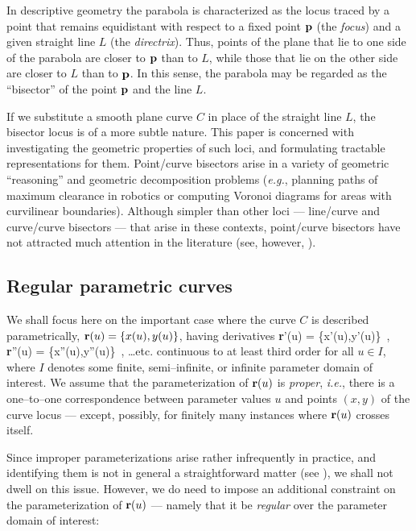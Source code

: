 In descriptive geometry \cite{coxeter69} the parabola is
characterized as the locus traced by a point that remains
equidistant with respect to a fixed point ${\bf p}$ (the
{\it focus\/}) and a given straight line $L$ (the {\it
directrix\/}). Thus, points of the plane that lie to one
side of the parabola are closer to ${\bf p}$ than to $L$,
while those that lie on the other side are closer to $L$
than to ${\bf p}$. In this sense, the parabola may be
regarded as the ``bisector'' of the point ${\bf p}$ and
the line $L$.

If we substitute a smooth plane curve $C$ in place of
the straight line $L$, the bisector locus is of a more
subtle nature. This paper is concerned with investigating
the geometric properties of such loci, and formulating
tractable representations for them. Point/curve bisectors
arise in a variety of geometric ``reasoning'' and geometric
decomposition problems ({\it e.g.}, planning paths of maximum
clearance in robotics or computing Voronoi diagrams for areas
with curvilinear boundaries). Although simpler than other
loci --- line/curve and curve/curve bisectors --- that arise
in these contexts, point/curve bisectors have not attracted
much attention in the literature (see, however, \cite
{yap87,yap89}).

\subsection{Regular parametric curves}

We shall focus here on the important case where the curve $C$
is described parametrically, ${\bf r}(u)=\{x(u),y(u)\}$, having
derivatives
\be \label{derivs}
{\bf r}'(u) = \{x'(u),y'(u)\} \,, \quad
{\bf r}''(u) = \{x''(u),y''(u)\} \,, \quad
\ldots {\rm etc.}
\ee
continuous to at least third order for all $u \in I$, where $I$
denotes some finite, semi--infinite, or infinite parameter domain
of interest. We assume that the parameterization of ${\bf r}(u)$
is {\it proper}, {\it i.e.}, there is a one--to--one correspondence
between parameter values $u$ and points $(x,y)$ of the curve
locus --- except, possibly, for finitely many instances where
${\bf r}(u)$ crosses itself.

Since improper parameterizations arise rather infrequently in
practice, and identifying them is not in general a straightforward
matter (see \cite{sederberg84,sederberg86}), we shall not dwell on
this issue. However, we do need to impose an additional constraint
on the parameterization of ${\bf r}(u)$ --- namely that it be {\it
regular\/} over the parameter domain of interest:

